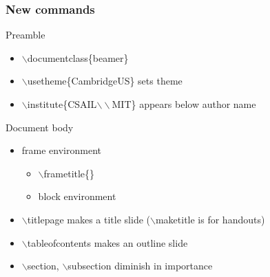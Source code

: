\documentclass[ignorenonframetext]{beamer}
\newcommand{\abbr}[1]{#1}
\renewcommand{\mit}{\abbr{MIT}}
\begin{document}
\begin{frame}
  \frametitle{New commands}
  \begin{block}{Preamble}
    \begin{itemize}
    \item $\backslash$documentclass\{beamer\}
    \item $\backslash$usetheme\{CambridgeUS\} sets theme
    \item $\backslash$institute\{CSAIL$\backslash\backslash$\mit\} appears below author name
    \end{itemize}
  \end{block}
  \begin{block}{Document body}
    \begin{itemize}
    \item frame environment
      \begin{itemize}
      \item $\backslash$frametitle\{\}
      \item block environment
      \end{itemize}
    \item $\backslash$titlepage makes a title slide ($\backslash$maketitle is for handouts)
    \item $\backslash$tableofcontents makes an outline slide
    \item $\backslash$section, $\backslash$subsection diminish in importance
    \end{itemize}
  \end{block}
\end{frame}
\end{document}
